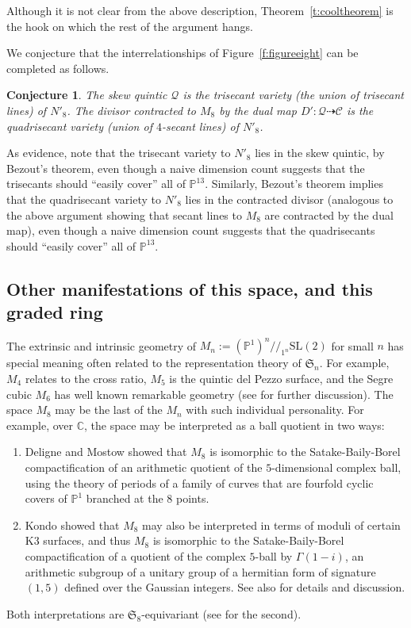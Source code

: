 \documentclass{amsart}
\newtheorem{conj}[theorem]{Conjecture}
\theoremstyle{definition}
\theoremstyle{remark}
\def\SL{\mathrm{SL}}
\def\SS{\mathfrak{S}}
\def\P{\mathbb{P}}
\def\proj{\mathbb{P}}
\def\C{\mathbb{C}}
\def\cq{/\!/}
\def\cubic{\mathcal{C}}
\def\quintic{\mathcal{Q}}
\begin{document}
Although it is not clear from the above description, Theorem~\ref{t:cooltheorem} is the hook on which the rest of
the argument hangs.

We conjecture that the interrelationships of Figure~\ref{f:figureeight} can be completed as follows.

\begin{conj}
The skew quintic $\quintic$ is the trisecant variety (the union of trisecant {\em lines}) of $N'_8$.  The divisor
contracted to $M_8$ by the dual map $D': \quintic \dashrightarrow \cubic$ is the quadrisecant variety (union of
$4$-secant lines) of $N'_8$.\label{conj}
\end{conj}

As evidence, note that the trisecant variety to $N'_8$ lies in the skew quintic, by Bezout's theorem, even though a
naive dimension count suggests that the trisecants should ``easily cover'' all of $\proj^{13}$.  Similarly, Bezout's
theorem implies that the quadrisecant variety to $N'_8$ lies in the contracted divisor (analogous to the above argument
showing that secant lines to $M_8$ are contracted by the dual map),
even though  a naive dimension count suggests that the
quadrisecants should ``easily cover'' all of $\proj^{13}$.

\subsection{Other manifestations of this space, and this graded ring}
\label{othermanifestations}

The extrinsic and intrinsic geometry of $M_n := (\proj^1)^n \!\cq_{1^n} \SL(2)$ for small $n$ has special meaning often
related to the representation theory of $\SS_n$.  For example, $M_4$ relates to the cross ratio, $M_5$ is the quintic
del Pezzo surface, and the Segre cubic $M_6$ has well known remarkable
geometry (see \cite{hmsv6} for further discussion).
The space $M_8$ may be the last of the $M_n$ with such individual personality.  For example, over $\C$, the space may
be interpreted as a ball quotient in two ways:
\begin{enumerate}
\item Deligne and Mostow \cite{dm} showed that $M_8$ is isomorphic to the Satake-Baily-Borel compactification of an
arithmetic quotient of the $5$-dimensional complex ball, using the theory of periods of a family of curves that are
fourfold cyclic covers of $\P^1$ branched at the $8$ points.
\item Kondo \cite{kondo} showed that $M_8$ may also be interpreted in terms of moduli of certain K3 surfaces, and thus
$M_8$ is isomorphic to the Satake-Baily-Borel compactification of a quotient of the complex $5$-ball by $\Gamma(1-i)$,
an arithmetic subgroup of a unitary group of a hermitian form of signature $(1,5)$ defined over the Gaussian integers.
See also \cite[p.~12]{fs} for details  and discussion.
\end{enumerate}
Both interpretations are $\SS_8$-equivariant (see \cite[p.~8]{kondo} for the second).
\end{document}
